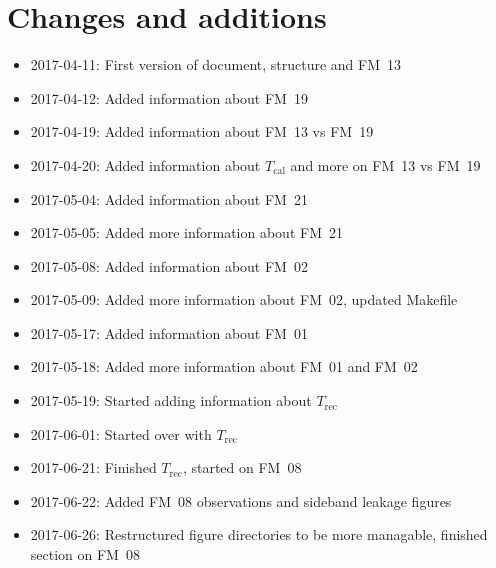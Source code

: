 \chapter{Changes and additions}
\label{ch:changes}

\begin{itemize}
    \item 2017-04-11: First version of document, structure and FM~13
    \item 2017-04-12: Added information about FM~19
    \item 2017-04-19: Added information about FM~13 vs FM~19
    \item 2017-04-20: Added information about $T_\mathrm{cal}$
                      and more on FM~13 vs FM~19
    \item 2017-05-04: Added information about FM~21
    \item 2017-05-05: Added more information about FM~21
    \item 2017-05-08: Added information about FM~02
    \item 2017-05-09: Added more information about FM~02, updated Makefile
    \item 2017-05-17: Added information about FM~01
    \item 2017-05-18: Added more information about FM~01 and FM~02
    \item 2017-05-19: Started adding information about $T_\mathrm{rec}$
    \item 2017-06-01: Started over with $T_\mathrm{rec}$
    \item 2017-06-21: Finished $T_\mathrm{rec}$, started on FM~08
    \item 2017-06-22: Added FM~08 observations and sideband leakage figures
    \item 2017-06-26: Restructured figure directories to be more managable,
                      finished section on FM~08
\end{itemize}
